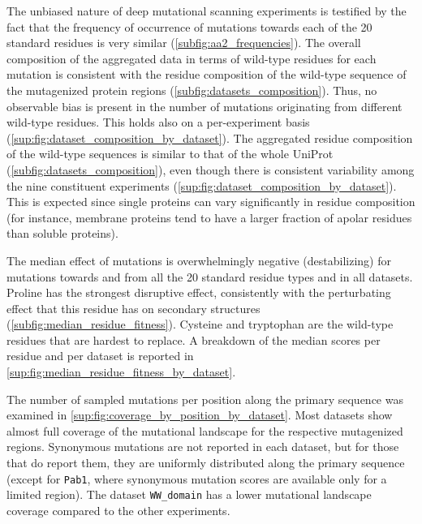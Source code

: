 The unbiased nature of deep mutational scanning experiments is testified by the fact that the frequency of occurrence of mutations towards each of the \num{20} standard residues is very similar (\cref{subfig:aa2_frequencies}).
The overall composition of the aggregated data in terms of wild-type residues for each mutation is consistent with the residue composition of the wild-type sequence of the mutagenized protein regions (\cref{subfig:datasets_composition}).
Thus, no observable bias is present in the number of mutations originating from different wild-type residues.
This holds also on a per-experiment basis (\cref{sup:fig:dataset_composition_by_dataset}).
The aggregated residue composition of the wild-type sequences is similar to that of the whole UniProt (\cref{subfig:datasets_composition}), even though there is consistent variability among the nine constituent experiments (\cref{sup:fig:dataset_composition_by_dataset}).
This is expected since single proteins can vary significantly in residue composition (for instance, membrane proteins tend to have a larger fraction of apolar residues than soluble proteins).

The median effect of mutations is overwhelmingly negative (destabilizing) for mutations towards and from all the \num{20} standard residue types and in all datasets.
Proline has the strongest disruptive effect, consistently with the perturbating effect that this residue has on secondary structures (\cref{subfig:median_residue_fitness}).
Cysteine and tryptophan are the wild-type residues that are hardest to replace.
A breakdown of the median scores per residue and per dataset is reported in \cref{sup:fig:median_residue_fitness_by_dataset}.

The number of sampled mutations per position along the primary sequence was examined in \cref{sup:fig:coverage_by_position_by_dataset}.
Most datasets show almost full coverage of the mutational landscape for the respective mutagenized regions.
Synonymous mutations are not reported in each dataset, but for those that do report them, they are uniformly distributed along the primary sequence (except for \texttt{Pab1}, where synonymous mutation scores are available only for a limited region).
The dataset \texttt{WW\_domain} has a lower mutational landscape coverage compared to the other experiments.

